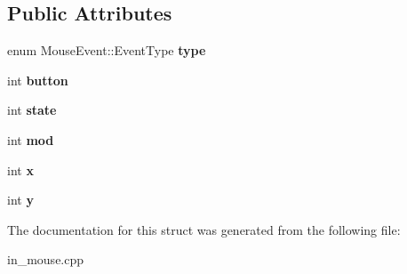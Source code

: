 \subsection*{Public Attributes}
\begin{DoxyCompactItemize}
\item 
enum Mouse\+Event\+::\+Event\+Type {\bfseries type}\hypertarget{structMouseEvent_a092db887c3a1affe3244dbe9630785b8}{}\label{structMouseEvent_a092db887c3a1affe3244dbe9630785b8}

\item 
int {\bfseries button}\hypertarget{structMouseEvent_a3b8e724a916508b95ef5c4f36e8424d4}{}\label{structMouseEvent_a3b8e724a916508b95ef5c4f36e8424d4}

\item 
int {\bfseries state}\hypertarget{structMouseEvent_a8b0934f54b71078f30ee73800939a9f6}{}\label{structMouseEvent_a8b0934f54b71078f30ee73800939a9f6}

\item 
int {\bfseries mod}\hypertarget{structMouseEvent_a3145e5d0481e6205a13e4d817c8891ab}{}\label{structMouseEvent_a3145e5d0481e6205a13e4d817c8891ab}

\item 
int {\bfseries x}\hypertarget{structMouseEvent_a2b89f4529866190e623ee04b37f59b30}{}\label{structMouseEvent_a2b89f4529866190e623ee04b37f59b30}

\item 
int {\bfseries y}\hypertarget{structMouseEvent_a766882bf2ff5883fa797761cdb1bb7b7}{}\label{structMouseEvent_a766882bf2ff5883fa797761cdb1bb7b7}

\end{DoxyCompactItemize}


The documentation for this struct was generated from the following file\+:\begin{DoxyCompactItemize}
\item 
in\+\_\+mouse.\+cpp\end{DoxyCompactItemize}
